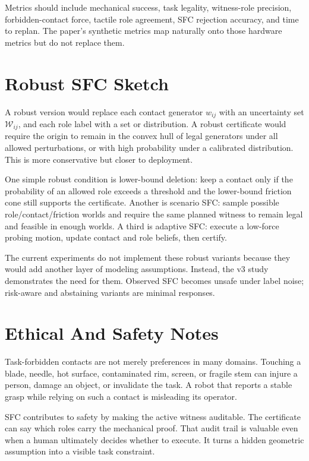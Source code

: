 \documentclass{article}
\begin{document}
Metrics should include mechanical success, task legality, witness-role precision, forbidden-contact force, tactile role agreement, SFC rejection accuracy, and time to replan. The paper's synthetic metrics map naturally onto those hardware metrics but do not replace them.

\section{Robust SFC Sketch}

A robust version would replace each contact generator \(w_{ij}\) with an uncertainty set \(\mathcal{W}_{ij}\), and each role label with a set or distribution. A robust certificate would require the origin to remain in the convex hull of legal generators under all allowed perturbations, or with high probability under a calibrated distribution. This is more conservative but closer to deployment.

One simple robust condition is lower-bound deletion: keep a contact only if the probability of an allowed role exceeds a threshold and the lower-bound friction cone still supports the certificate. Another is scenario SFC: sample possible role/contact/friction worlds and require the same planned witness to remain legal and feasible in enough worlds. A third is adaptive SFC: execute a low-force probing motion, update contact and role beliefs, then certify.

The current experiments do not implement these robust variants because they would add another layer of modeling assumptions. Instead, the v3 study demonstrates the need for them. Observed SFC becomes unsafe under label noise; risk-aware and abstaining variants are minimal responses.

\section{Ethical And Safety Notes}

Task-forbidden contacts are not merely preferences in many domains. Touching a blade, needle, hot surface, contaminated rim, screen, or fragile stem can injure a person, damage an object, or invalidate the task. A robot that reports a stable grasp while relying on such a contact is misleading its operator.

SFC contributes to safety by making the active witness auditable. The certificate can say which roles carry the mechanical proof. That audit trail is valuable even when a human ultimately decides whether to execute. It turns a hidden geometric assumption into a visible task constraint.
\end{document}
